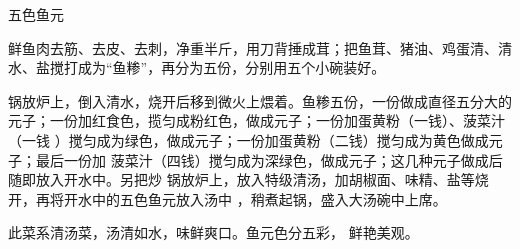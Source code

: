 \begin{recipe}[五福鱼元]{五色鱼元}

\ingredients


\preparation

\step 鲜鱼肉去筋、去皮、去刺，净重半斤，用刀背捶成茸；把鱼茸、猪油、鸡蛋清、清
水、盐搅打成为“鱼糁”，再分为五份，分别用五个小碗装好。

\step 锅放炉上，倒入清水，烧开后移到微火上煨着。鱼糁五份，一份做成直径五分大的
元子；一份加红食色，揽匀成粉红色，做成元子；一份加蛋黄粉（一钱）、菠菜汁（一钱
）搅匀成为绿色，做成元子；一份加蛋黄粉（二钱）搅匀成为黄色做成元子；最后一份加
菠菜汁（四钱）搅匀成为深绿色，做成元子；这几种元子做成后随即放入开水中。另把炒
锅放炉上，放入特级清汤，加胡椒面、味精、盐等烧开，再将开水中的五色鱼元放入汤中
，稍煮起锅，盛入大汤碗中上席。

\features

此菜系清汤菜，汤清如水，味鲜爽口。鱼元色分五彩， 鲜艳美观。

\end{recipe}

